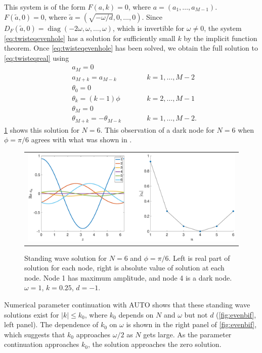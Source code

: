 \documentclass[12pt]{article}
\DeclareMathOperator{\diag}{diag}
\begin{document}
This system is of the form $F(a,k) = 0$, where $a = (a_1, \dots, a_{M-1})$. $F(\tilde{a}, 0) = 0$, where $\tilde{a} = (\sqrt{-\omega/d}, 0, \dots, 0)$. Since $D_F(\tilde{a}, 0) = \diag(-2\omega,\omega, \dots, \omega)$, which is invertible for $\omega \neq 0$, the system \cref{eq:twisteqevenhole} has a solution for sufficiently small $k$ by the implicit function theorem. Once \cref{eq:twisteqevenhole} has been solved, we obtain the full solution to \cref{eq:twisteqreal} using
\begin{align*}
&a_M = 0 \\
&a_{M+k} = a_{M-k} && \qquad k = 1, \dots, M-2 \\
&\theta_0 = 0 \\
&\theta_k = (k-1)\phi && \qquad  k = 2, \dots, M-1 \\
&\theta_M = 0 \\
&\theta_{M+k} = -\theta_{M-k} && \qquad k = 1, \dots, M-2.
\end{align*}
\cref{fig:evenhole6} shows this solution for $N=6$. This observation of a dark node for $N = 6$ when $\phi = \pi/6$ agrees with what was shown in \cite{castro2016}. 
\begin{figure}[H]
\begin{center}
\begin{tabular}{c}
\includegraphics[width=15cm]{images/evenhole6.eps}
\end{tabular}
\end{center}
\caption{Standing wave solution for $N = 6$ and $\phi = \pi/6$. Left is real part of solution for each node, right is absolute value of solution at each node. Node 1 has maximum amplitude, and node 4 is a dark node. $\omega = 1$, $k = 0.25$, $d=-1$.}
\label{fig:evenhole6}
\end{figure}
Numerical parameter continuation with AUTO shows that these standing wave solutions exist for $|k| \leq k_0$, where $k_0$ depends on $N$ and $\omega$ but not $d$ (\cref{fig:evenbif}, left panel). The dependence of $k_0$ on $\omega$ is shown in the right panel of \cref{fig:evenbif}, which suggests that $k_0$ approaches $\omega/2$ as $N$ gets large. As the parameter continuation approaches $k_0$, the solution approaches the zero solution. 
\end{document}
